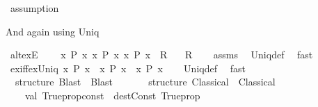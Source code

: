 \begin{isabellebody}
\ assumption%
\endisatagproof
{\isafoldproof}%
%
\isadelimproof
%
\endisadelimproof
%
\begin{isamarkuptext}%
And again using Uniq%
\end{isamarkuptext}\isamarkuptrue%
\isamarkupfalse%
\ alt{\isacharunderscore}{\kern0pt}ex{}E{\isacharprime}{\kern0pt}{\isacharcolon}{\kern0pt}\isanewline
\ \ \ \ {\isachardoublequoteopen}{\isasymexists}{\isacharbang}{\kern0pt}x{\isachardot}{\kern0pt}\ P\ x{\isachardoublequoteclose}\ {\isachardoublequoteopen}{\isasymAnd}x{\isachardot}{\kern0pt}\ {\isasymlbrakk}P\ x{\isacharsemicolon}{\kern0pt}\ {\isasymexists}\isactrlsub {\isasymle}x{\isachardot}{\kern0pt}\ P\ x{\isasymrbrakk}\ {\isasymLongrightarrow}\ R{\isachardoublequoteclose}\isanewline
\ \ \ R\isanewline
%
\isadelimproof
\ \ %
\endisadelimproof
%
\isatagproof
{}\isamarkupfalse%
\ assms\ \isamarkupfalse%
\ Uniq{\isacharunderscore}{\kern0pt}def\ \isamarkupfalse%
\ fast%
\endisatagproof
{\isafoldproof}%
%
\isadelimproof
\isanewline
%
\endisadelimproof
\isanewline
{}\isamarkupfalse%
\ ex{}{\isacharunderscore}{\kern0pt}iff{\isacharunderscore}{\kern0pt}ex{\isacharunderscore}{\kern0pt}Uniq{\isacharcolon}{\kern0pt}\ {\isachardoublequoteopen}{\isacharparenleft}{\kern0pt}{\isasymexists}{\isacharbang}{\kern0pt}x{\isachardot}{\kern0pt}\ P\ x{\isacharparenright}{\kern0pt}\ {\isasymlongleftrightarrow}\ {\isacharparenleft}{\kern0pt}{\isasymexists}x{\isachardot}{\kern0pt}\ P\ x{\isacharparenright}{\kern0pt}\ {\isasymand}\ {\isacharparenleft}{\kern0pt}{\isasymexists}\isactrlsub {\isasymle}x{\isachardot}{\kern0pt}\ P\ x{\isacharparenright}{\kern0pt}{\isachardoublequoteclose}\isanewline
%
\isadelimproof
\ \ %
\endisadelimproof
%
\isatagproof
{}\isamarkupfalse%
\ Uniq{\isacharunderscore}{\kern0pt}def\ \isamarkupfalse%
\ fast%
\endisatagproof
{\isafoldproof}%
%
\isadelimproof
\isanewline
%
\endisadelimproof
\isanewline
%
\isadelimML
\isanewline
%
\endisadelimML
%
\isatagML
{}\isamarkupfalse%
\ {\isacartoucheopen}\isanewline
\ \ structure\ Blast\ {\isacharequal}{\kern0pt}\ Blast\isanewline
\ \ {\isacharparenleft}{\kern0pt}\isanewline
\ \ \ \ structure\ Classical\ {\isacharequal}{\kern0pt}\ Classical\isanewline
\ \ \ \ val\ Trueprop{\isacharunderscore}{\kern0pt}const\ {\isacharequal}{\kern0pt}\ dest{\isacharunderscore}{\kern0pt}Const\ \isactrlConst {\isasymopen}Trueprop{\isasymclose}\isanewline

\end{isabellebody}
